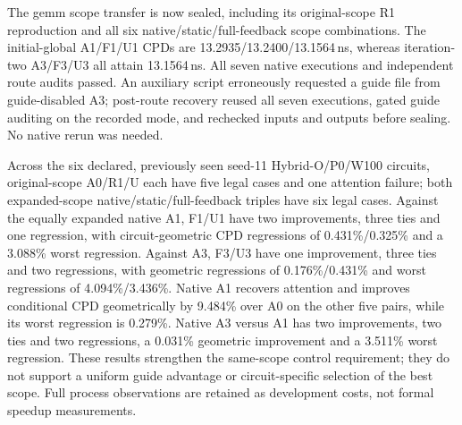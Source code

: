 \documentclass[conference,10pt]{IEEEtran}
\begin{document}
The gemm scope transfer is now sealed, including its original-scope R1 reproduction and all six native/static/full-feedback scope combinations. The initial-global A1/F1/U1 CPDs are 13.2935/13.2400/13.1564\,ns, whereas iteration-two A3/F3/U3 all attain 13.1564\,ns. All seven native executions and independent route audits passed. An auxiliary script erroneously requested a guide file from guide-disabled A3; post-route recovery reused all seven executions, gated guide auditing on the recorded mode, and rechecked inputs and outputs before sealing. No native rerun was needed.

Across the six declared, previously seen seed-11 Hybrid-O/P0/W100 circuits, original-scope A0/R1/U each have five legal cases and one attention failure; both expanded-scope native/static/full-feedback triples have six legal cases. Against the equally expanded native A1, F1/U1 have two improvements, three ties and one regression, with circuit-geometric CPD regressions of 0.431\%/0.325\% and a 3.088\% worst regression. Against A3, F3/U3 have one improvement, three ties and two regressions, with geometric regressions of 0.176\%/0.431\% and worst regressions of 4.094\%/3.436\%. Native A1 recovers attention and improves conditional CPD geometrically by 9.484\% over A0 on the other five pairs, while its worst regression is 0.279\%. Native A3 versus A1 has two improvements, two ties and two regressions, a 0.031\% geometric improvement and a 3.511\% worst regression. These results strengthen the same-scope control requirement; they do not support a uniform guide advantage or circuit-specific selection of the best scope. Full process observations are retained as development costs, not formal speedup measurements.
\end{document}
